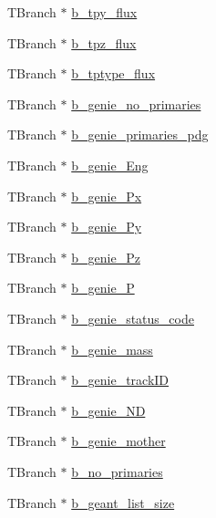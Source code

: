 \begin{DoxyCompactItemize}
\item 
T\-Branch $\ast$ \hyperlink{classanatree_a942d09465dd88e086c861c0c939b89ad}{b\-\_\-tpy\-\_\-flux}
\item 
T\-Branch $\ast$ \hyperlink{classanatree_a26395edd0c113d77708a2280adb7cc04}{b\-\_\-tpz\-\_\-flux}
\item 
T\-Branch $\ast$ \hyperlink{classanatree_ad6eb89bc66c3d4513a8e9f2b2b660288}{b\-\_\-tptype\-\_\-flux}
\item 
T\-Branch $\ast$ \hyperlink{classanatree_a743aeb64ffacd746a1092ab0c977fb7b}{b\-\_\-genie\-\_\-no\-\_\-primaries}
\item 
T\-Branch $\ast$ \hyperlink{classanatree_ae244d4ab7cf75479fa6b0d55361e730e}{b\-\_\-genie\-\_\-primaries\-\_\-pdg}
\item 
T\-Branch $\ast$ \hyperlink{classanatree_a16458ca4cb41a63c31daa341db5da251}{b\-\_\-genie\-\_\-\-Eng}
\item 
T\-Branch $\ast$ \hyperlink{classanatree_a4461eb0668e09bac7267bafc18dce9b3}{b\-\_\-genie\-\_\-\-Px}
\item 
T\-Branch $\ast$ \hyperlink{classanatree_a7a98969216617c910e72975a1ff31d03}{b\-\_\-genie\-\_\-\-Py}
\item 
T\-Branch $\ast$ \hyperlink{classanatree_a6e5e3fa784472042f877267c2ab1593e}{b\-\_\-genie\-\_\-\-Pz}
\item 
T\-Branch $\ast$ \hyperlink{classanatree_a69b72987e24babf9f1fe5fc812c533af}{b\-\_\-genie\-\_\-\-P}
\item 
T\-Branch $\ast$ \hyperlink{classanatree_a03fa50d25c4b11f5c0903ab816008bd5}{b\-\_\-genie\-\_\-status\-\_\-code}
\item 
T\-Branch $\ast$ \hyperlink{classanatree_acd3c9015618983ea55cd390cf8931ded}{b\-\_\-genie\-\_\-mass}
\item 
T\-Branch $\ast$ \hyperlink{classanatree_a76511019966b4c85d648021a9f472620}{b\-\_\-genie\-\_\-track\-I\-D}
\item 
T\-Branch $\ast$ \hyperlink{classanatree_aa3fba1f98f0b39993b337b87bf0505ff}{b\-\_\-genie\-\_\-\-N\-D}
\item 
T\-Branch $\ast$ \hyperlink{classanatree_ac125d9de5570958ba45bda699adc76f4}{b\-\_\-genie\-\_\-mother}
\item 
T\-Branch $\ast$ \hyperlink{classanatree_a5103ef779eea8e02c35a28799adc68e2}{b\-\_\-no\-\_\-primaries}
\item 
T\-Branch $\ast$ \hyperlink{classanatree_a93b176b810cb70bbbc3a4f3637d34ca0}{b\-\_\-geant\-\_\-list\-\_\-size}
\item 

\end{DoxyCompactItemize}
